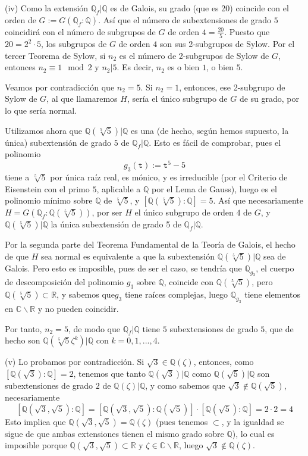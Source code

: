 (iv) Como la extensión  $\mathbb{Q}_f | \mathbb{Q}$ es de Galois, su grado (que es 20) coincide con el orden de $G := G(\mathbb{Q}_f : \mathbb{Q})$. Así que el número de subextensiones de grado $5$ coincidirá con el número de subgrupos de $G$ de orden $4 = \frac{20}{5}$. Puesto que $20 = 2^2 \cdot 5$, los subgrupos de $G$ de orden $4$ son sus 2-subgrupos de Sylow. Por el tercer Teorema de Sylow, si $n_2$ es el número de 2-subgrupos de Sylow de $G$, entonces $n_2 \equiv1\mod 2$ y $n_2 | 5$. Es decir, $n_2$ es o bien $1$, o bien $5$.

Veamos por contradicción que $n_2 = 5$. Si $n_2 = 1$, entonces, ese 2-subgrupo de Sylow de $G$, al que llamaremos $H$, sería el único subgrupo de $G$ de su grado, por lo que sería normal.

Utilizamos ahora que $\mathbb{Q}(\sqrt[5]{5})|\mathbb{Q}$ es una (de hecho, según hemos supuesto, la única) subextensión de grado $5$ de $\mathbb{Q}_f | \mathbb{Q}$. Esto es fácil de comprobar, pues el polinomio
$$g_3(\mathtt{t}) := \mathtt{t}^5 - 5$$
tiene a $\sqrt[5]{5}$ por única raíz real, es mónico, y es irreducible (por el Criterio de Eisenstein con el primo $5$, aplicable a $\mathbb{Q}$ por el Lema de Gauss), luego es el polinomio mínimo sobre $\mathbb{Q}$ de $\sqrt[5]{5}$, y $[\mathbb{Q}(\sqrt[5]{5}) : \mathbb{Q}] = 5$. Así que necesariamente $H = G(\mathbb{Q}_f : \mathbb{Q}(\sqrt[5]{5}))$, por ser $H$ el único subgrupo de orden $4$ de $G$, y $\mathbb{Q}(\sqrt[5]{5}) | \mathbb{Q}$ la única subextensión de grado 5 de $\mathbb{Q}_f | \mathbb{Q}$.

Por la segunda parte del Teorema Fundamental de la Teoría de Galois, el hecho de que $H$ sea normal es equivalente a que la subextensión $\mathbb{Q}(\sqrt[5]{5})|\mathbb{Q}$ sea de Galois. Pero esto es imposible, pues de ser el caso, se tendría que $\mathbb{Q}_{g_3}$, el cuerpo de descomposición del polinomio $g_3$ sobre $\mathbb{Q}$, coincide con $\mathbb{Q}(\sqrt[5]{5})$, pero $\mathbb{Q}(\sqrt[5]{5}) \subset \mathbb{R}$, y sabemos que$g_3$ tiene raíces complejas, luego $\mathbb{Q}_{g_3}$ tiene elementos en $\mathbb{C} \backslash \mathbb{R}$ y no pueden coincidir.

Por tanto, $n_2 = 5$, de modo que $\mathbb{Q}_f | \mathbb{Q}$ tiene $5$ subextensiones de grado $5$, que de hecho son $\mathbb{Q}(\sqrt[5]{5}\zeta^k) | \mathbb{Q}$ con $k=0,1,...,4$.

(v) Lo probamos por contradicción. Si $\sqrt{3} \in \mathbb{Q}(\zeta)$, entonces, como $[\mathbb{Q}(\sqrt{3}):\mathbb{Q}] = 2$, tenemos que tanto $\mathbb{Q}(\sqrt{3})|\mathbb{Q}$ como $\mathbb{Q}(\sqrt{5})|\mathbb{Q}$ son subextensiones de grado $2$ de $\mathbb{Q}(\zeta) | \mathbb{Q}$, y como sabemos que $\sqrt{3} \notin \mathbb{Q}(\sqrt{5})$, necesariamente
$$[\mathbb{Q}(\sqrt{3}, \sqrt{5}):\mathbb{Q}] = [\mathbb{Q}(\sqrt{3}, \sqrt{5}):\mathbb{Q}(\sqrt{5})] \cdot [\mathbb{Q}(\sqrt{5}):\mathbb{Q}] = 2 \cdot 2 = 4$$
Esto implica que $\mathbb{Q}(\sqrt{3}, \sqrt{5}) = \mathbb{Q}(\zeta)$ (pues tenemos $\subset$, y la igualdad se sigue de que ambas extensiones tienen el mismo grado sobre $\mathbb{Q}$), lo cual es imposible porque $\mathbb{Q}(\sqrt{3}, \sqrt{5}) \subset \mathbb{R}$ y $\zeta \in \mathbb{C} \backslash \mathbb{R}$, luego $\sqrt{3} \notin \mathbb{Q}(\zeta)$.

